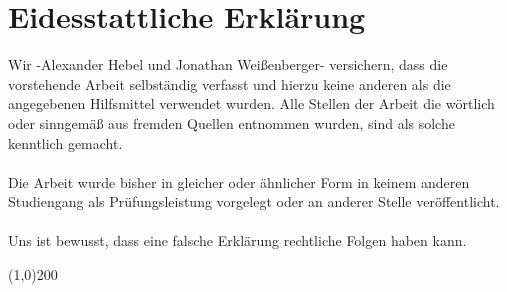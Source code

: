 \chapter{Eidesstattliche Erklärung}
Wir -Alexander Hebel und Jonathan Weißenberger- versichern, dass die vorstehende Arbeit selbständig verfasst und hierzu
keine anderen als die angegebenen Hilfsmittel verwendet wurden. Alle Stellen der Arbeit die 
wörtlich oder sinngemäß aus fremden Quellen entnommen wurden, sind als solche kenntlich gemacht.
\\
\\
Die Arbeit wurde bisher in gleicher oder ähnlicher Form in keinem anderen
Studiengang als Prüfungsleistung vorgelegt oder an anderer Stelle
veröffentlicht.
\\
\\
Uns ist bewusst, dass eine falsche Erklärung rechtliche Folgen haben kann.

\vspace*{1.5cm} \par
\line(1,0){200} \par
